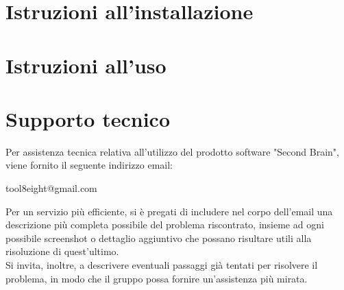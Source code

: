 \documentclass[a4paper,10pt]{article}
\begin{document}
\section{Istruzioni all'installazione}

\section{Istruzioni all'uso}

\section{Supporto tecnico}
Per assistenza tecnica relativa all'utilizzo del prodotto software "Second Brain", viene fornito il seguente indirizzo email: 
\begin{center}
    tool8eight@gmail.com
\end{center}
Per un servizio più efficiente, si è pregati di includere nel corpo dell'email una descrizione più completa possibile del problema riscontrato, insieme ad ogni possibile screenshot o dettaglio aggiuntivo che possano risultare utili alla risoluzione di quest'ultimo. \\
Si invita, inoltre, a descrivere eventuali passaggi già tentati per risolvere il problema, in modo che il gruppo possa fornire un'assistenza più mirata.
\end{document}

